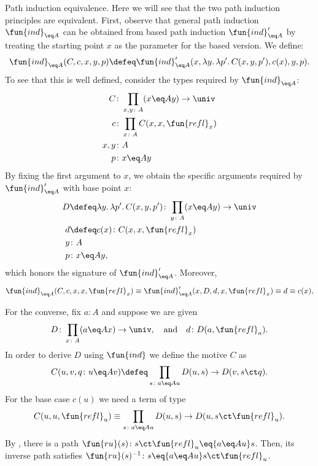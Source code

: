 \begin{lpar}{Path induction equivalence.}
    Here we will see that the two path induction principles are equivalent. First, observe that general path induction $\fun{ind}_{\eq A}$ can be obtained from based path induction $\fun{ind}'_{\eq A}$ by treating the starting point $x$ as the parameter for the based version. We define:
    \[
        \fun{ind}_{\eq A}(C,c,x,y,p)
        \defeq
            \fun{ind}'_{\eq A}(x,\lambda y.\,\lambda p'.\,C(x,y,p'),
            c(x),y,p).
    \]
    To see that this is well defined, consider the types required by $\fun{ind}_{\eq A}$:
    \begin{align*}
        C &\colon\prod_{x,y\colon A}(x\eq Ay)\to\univ\\
        c &\colon \prod_{x\colon A}C(x,x,\fun{refl}_x)\\
        x,y &\colon A\\
        p &\colon x\eq Ay
    \end{align*}
    By fixing the first argument to $x$, we obtain the specific arguments required by $\fun{ind}'_{\eq A}$ with base point $x$:
    \begin{align*}
        D&\defeq\lambda y.\,\lambda p'.\,C(x,y,p')\colon\prod_{y\colon A}(x\eq Ay)\to\univ\\
        d &\defeq c(x) \colon C(x,x,\fun{refl}_x)\\
        y &\colon A\\
        p &\colon x\eq A y,
    \end{align*}
    which honors the signature of $\fun{ind}'_{\eq A}$. Moreover,
    \[
        \fun{ind}_{\eq A}(C,c,x,x,\fun{refl}_x)
        \equiv \fun{ind}'_{\eq A}(x,D,d,x,\fun{refl}_x)
        \equiv d\equiv c(x),
    \]

    For the converse, fix  $a\colon A$ and suppose we are given
    \[
        D\colon\prod_{x\colon A}(a\eq Ax)\to\univ, \quad \text{and} \quad d\colon D(a,\fun{refl}_a).
    \]
    In order to derive  $D$ using  $\fun{ind}$ we define the motive  $C$ as
    \begin{equation}\label{eq:ind-domain-function}
        C(u,v,q\colon u\eq Av)\defeq\prod_{s\colon a\eq Au}D(u,s)\to D(v,s\ct q).
    \end{equation}
    For the base case  $c(u)$ we need a term of type
    \[
        C(u,u,\fun{refl}_u)\equiv\prod_{s\colon a\eq Au}D(u,s)\to D(u,s\ct\fun{refl}_u).
    \]
    By , there is a path  $\fun{ru}(s)\colon s\ct\fun{refl}_u\eq{a\eq Au}s$. Then, its inverse path satisfies  $\fun{ru}(s)^{-1}\colon s\eq{a\eq Au}s\ct\fun{refl}_u$.
    

\end{lpar}
